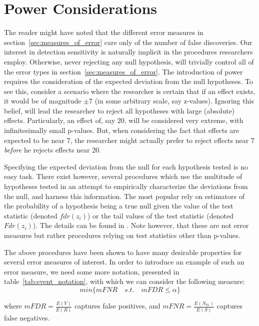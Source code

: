 \documentclass[draft,12pt]{article}
\begin{document}
\section{Power Considerations}
The reader might have noted that the different error measures in section~\ref{sec:measures_of_error} care only of the number of false discoveries. Our interest in detection sensitivity is naturally implicit in the procedures researchers employ. Otherwise, never rejecting any null hypothesis, will trivially control all of the error types in section~\ref{sec:measures_of_error}. 
The introduction of power requires the consideration of the expected deviation from the null hypotheses. To see this, consider a scenario where the researcher is certain that if an effect exists, it would be of magnitude $\pm7$ (in some arbitrary scale, say z-values). Ignoring this belief, will lead the researcher to reject all hypotheses with large (absolute) effects. Particularly, an effect of, say 20,  will be considered very extreme, with infinitesimally small p-values. But, when considering the fact that effects are expected to be near 7, the researcher might actually prefer to reject effects near 7 \emph{before} he rejects effects near 20. 

Specifying the expected deviation from the null for each hypothesis tested is no easy task. There exist however, several procedures which use the multitude of hypotheses tested in an attempt to empirically characterize the deviations from the null, and harness this information. The most popular rely on estimators of the probability of a hypothesis being a true null given the value of the test statistic (denoted $fdr(z_i)$) or the tail values of the test statistic (denoted $Fdr(z_i)$). The details can be found in \cite{efron_microarrays_2008}. Note however, that these are not error measures but rather procedures relying on test statistics other than p-values.  

The above procedures have been shown to have many desirable properties for several error measures of interest. In order to introduce an example of such an error measure, we need some more notation, presented in table~\ref{tab:event_notation}, with which we can consider the following measure:
\begin{equation} \label{eq:compound_error}
min\{mFNR \quad s.t. \quad mFDR\leq \alpha \}
\end{equation}

where $mFDR=\frac{E(V)}{E(R)}$ captures false positives, and 
$mFNR=\frac{E(N_{01})}{E(S)}$ captures false negatives.
\end{document}
